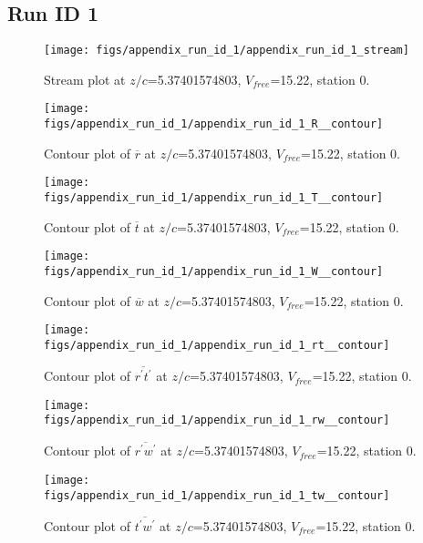 \subsection{Run ID 1}
\begin{figure}[H]
\centering
\texttt{[image: figs/appendix\_run\_id\_1/appendix\_run\_id\_1\_stream]}
\caption{Stream plot at $z/c$=5.37401574803, $V_{free}$=15.22, station 0.}
\label{fig:appendix_run_id_1_stream}
\end{figure}


\begin{figure}[H]
\centering
\texttt{[image: figs/appendix\_run\_id\_1/appendix\_run\_id\_1\_R\_\_contour]}
\caption{Contour plot of $\overline{r}$ at $z/c$=5.37401574803, $V_{free}$=15.22, station 0.}
\label{fig:appendix_run_id_1_R__contour}
\end{figure}


\begin{figure}[H]
\centering
\texttt{[image: figs/appendix\_run\_id\_1/appendix\_run\_id\_1\_T\_\_contour]}
\caption{Contour plot of $\overline{t}$ at $z/c$=5.37401574803, $V_{free}$=15.22, station 0.}
\label{fig:appendix_run_id_1_T__contour}
\end{figure}


\begin{figure}[H]
\centering
\texttt{[image: figs/appendix\_run\_id\_1/appendix\_run\_id\_1\_W\_\_contour]}
\caption{Contour plot of $\overline{w}$ at $z/c$=5.37401574803, $V_{free}$=15.22, station 0.}
\label{fig:appendix_run_id_1_W__contour}
\end{figure}


\begin{figure}[H]
\centering
\texttt{[image: figs/appendix\_run\_id\_1/appendix\_run\_id\_1\_rt\_\_contour]}
\caption{Contour plot of $\overline{r^\prime t^\prime}$ at $z/c$=5.37401574803, $V_{free}$=15.22, station 0.}
\label{fig:appendix_run_id_1_rt__contour}
\end{figure}


\begin{figure}[H]
\centering
\texttt{[image: figs/appendix\_run\_id\_1/appendix\_run\_id\_1\_rw\_\_contour]}
\caption{Contour plot of $\overline{r^\prime w^\prime}$ at $z/c$=5.37401574803, $V_{free}$=15.22, station 0.}
\label{fig:appendix_run_id_1_rw__contour}
\end{figure}


\begin{figure}[H]
\centering
\texttt{[image: figs/appendix\_run\_id\_1/appendix\_run\_id\_1\_tw\_\_contour]}
\caption{Contour plot of $\overline{t^\prime w^\prime}$ at $z/c$=5.37401574803, $V_{free}$=15.22, station 0.}
\label{fig:appendix_run_id_1_tw__contour}
\end{figure}


